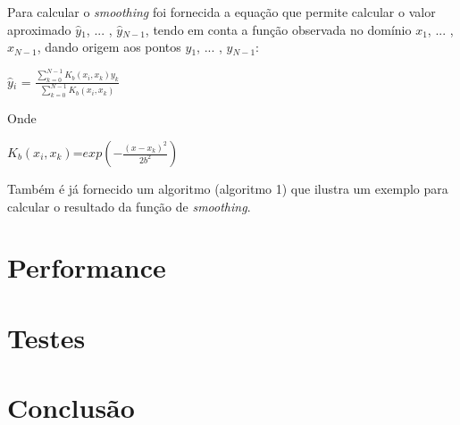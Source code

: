 \documentclass[a4paper]{article}
\begin{document}
	Para calcular o \textit{smoothing} foi fornecida a equação que permite calcular o valor aproximado $\hat{y}$$ _1$, $...$ , $\hat{y}$$ _{N-1}$, tendo em conta a função observada no domínio $x$$ _1$, $...$ , $x$$ _{N-1}$, dando origem aos pontos $y$$ _1$, $...$ , $y$$ _{N-1}$:
	

		$\hat{y}$$_i$ =  $\frac{ \sum_{k=0}^{N-1} K_b (x_i, x_k ) y_k}{\sum_{k=0}^{N-1} K_b (x_i, x_k )} $
		\label{eq:smoothing_function}
	
	Onde
	
	 	 $K_b (x_i,x_k)$=$exp(-\frac{(x-x_k)^2}{2b^2}) $
	 	 
	Também é já fornecido um algoritmo (algoritmo 1) que ilustra um exemplo para calcular o resultado da função de \textit{smoothing}.
	
	
	\section{Performance}
	
	\section{Testes} 
		
	\section{Conclusão}
\end{document}
